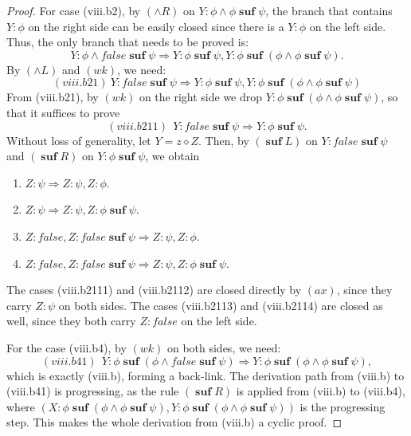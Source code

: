 \documentclass[manuscript,screen]{acmart}
\newcommand{\false}[0]{\mathit{false}}
\newcommand{\cat}[0]{\diamond}
\DeclareMathOperator{\osuf}{\mathbf{suf}}
\newcommand{\A}[1]{\mbox{ \textbf{#1} }}
\newcommand{\MO}{\A{MO}}
\newcommand{\EMO}{\A{EMO}}
\begin{document}
\begin{proof}
For case (viii.b2), by $(\wedge R)$ on $Y : \phi\wedge \phi\osuf\psi$, the branch that contains $Y:\phi$ on the right side can be easily closed since there is a $Y:\phi$ on the left side. 
Thus, the only branch that needs to be proved is: 
$$
Y : \phi\wedge \false\osuf\psi\Rightarrow Y :  \phi\osuf\psi, Y : \phi\osuf(\phi\wedge \phi\osuf\psi). 
$$
By $(\wedge L)$ and $(wk)$, we need:
$$
(viii.b21)\ Y : \false\osuf\psi\Rightarrow Y : \phi\osuf\psi, Y : \phi\osuf(\phi\wedge \phi\osuf\psi)
$$
From (viii.b21), by $(wk)$ on the right side we drop $Y : \phi\osuf(\phi\wedge \phi\osuf\psi)$, so that it suffices to prove
$$
(viii.b211)\ \ Y : \false\osuf\psi\Rightarrow Y : \phi\osuf\psi. 
$$
Without loss of generality, let $Y = z\cat Z$. 
Then, by $(\osuf L)$ on $Y : \false\osuf\psi$ and $(\osuf R)$ on $Y : \phi\osuf\psi$, we obtain
\begin{enumerate}
\item[(viii.b2111)] $Z : \psi\Rightarrow Z : \psi, Z : \phi$. 
\item[(viii.b2112)] $Z : \psi\Rightarrow Z : \psi, Z : \phi\osuf\psi$. 
\item[(viii.b2113)] $Z : \false, Z : \false\osuf\psi\Rightarrow Z : \psi, Z : \phi$. 
\item[(viii.b2114)] $Z : \false, Z : \false\osuf\psi\Rightarrow Z : \psi, Z : \phi\osuf\psi$. 
\end{enumerate}
The cases (viii.b2111) and (viii.b2112) are closed directly by $(ax)$, since they carry $Z : \psi$ on both sides. 
The cases (viii.b2113) and (viii.b2114) are closed as well, since they both carry $Z : \false$ on the left side. 

For the case (viii.b4), by $(wk)$ on both sides, we need:
$$
(viii.b41)\ \ Y : \phi\osuf(\phi\wedge\false\osuf\psi)\Rightarrow Y : \phi\osuf(\phi\wedge \phi\osuf\psi), 
$$
which is exactly (viii.b), forming a back-link. 
The derivation path from (viii.b) to (viii.b41) is progressing, as the rule $(\osuf R)$ is applied from (viii.b) to (viii.b4), where $(X : \phi\osuf(\phi\wedge \phi\osuf\psi), Y : \phi\osuf(\phi\wedge \phi\osuf\psi))$ is the progressing step. 
This makes the whole derivation from (viii.b) a cyclic proof. 

\ifx


\end{proof}
\end{document}
